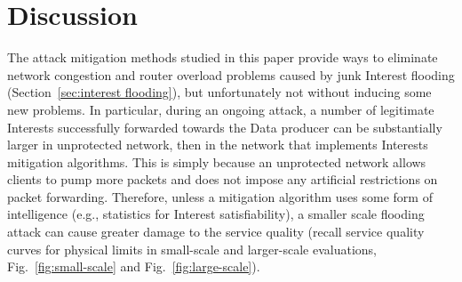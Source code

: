 \section{Discussion}
\label{sec:discussion}






The attack mitigation methods studied in this paper provide ways to eliminate network congestion and router overload problems caused by junk Interest flooding (Section~\ref{sec:interest flooding}), but unfortunately not without inducing some new problems.
In particular, during an ongoing attack, a number of legitimate Interests successfully forwarded towards the Data producer can be substantially larger in unprotected network, then in the network that implements Interests mitigation algorithms.  
This is simply because an unprotected network allows clients to pump more packets and does not impose any artificial restrictions on packet forwarding.
Therefore, unless a mitigation algorithm uses some form of intelligence (e.g., statistics for Interest satisfiability), a smaller scale flooding attack can cause greater damage to the service quality (recall service quality curves for physical limits in small-scale and larger-scale evaluations, Fig.~\ref{fig:small-scale} and Fig.~\ref{fig:large-scale}).

